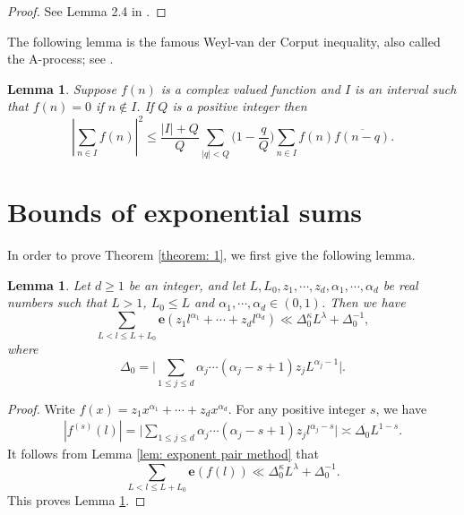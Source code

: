 \documentclass[12pt, reqno, twoside, letterpaper]{amsart}
\numberwithin{equation}{section}
\theoremstyle{customthm}
\newtheorem{lemma}[X]{Lemma}
\theoremstyle{customrem}
\renewcommand{\le}{\ensuremath{\leqslant}}
\begin{document}
\begin{proof}
See Lemma 2.4 in \cite{GrahamK1991}.
\end{proof}

The following lemma is the famous Weyl-van der Corput inequality, also called the A-process; see \cite[Lemma 2.5]{GrahamK1991}.

\begin{lemma}
\label{lem:A}
Suppose $f(n)$ is a complex valued function and $I$ is an interval such that $f(n) = 0$ if $n \notin I$. If $Q$ is a positive integer then
$$
|\sum_{n \in I} f(n)|^2 \le \frac{|I| + Q}{Q} \sum_{|q|< Q} \big(1 - \frac{q}{Q} \big) \sum_{n \in I} f(n) \overline{f(n-q)}.
$$
\end{lemma}

\section{Bounds of exponential sums}\label{section: bounds of es}

In order to prove Theorem \ref{theorem: 1}, we first give the following lemma.

\begin{lemma}\label{lemma: a lemmma to estimate S}
Let $d\geqslant 1$ be an integer, and let $L,L_0,z_1,\cdots,z_d,\alpha_1,\cdots,
\alpha_d$ be real numbers such that $L>1$, $L_0\leqslant L$ and
$\alpha_1,\cdots,\alpha_d\in(0,1)$. Then we have
$$
\sum_{L<l\leqslant L+L_0}\mathbf{e}\left(z_1l^{\alpha_1}+\cdots+z_dl^{\alpha_d}\right)
\ll \Delta_0^{\kappa}L^{\lambda}+\Delta_0^{-1},
$$
where
$$
\Delta_0=\Bigg|\sum_{1\leqslant j\leqslant d}\alpha_j\cdots(\alpha_j-s+1)z_jL^{\alpha_j-1}\Bigg|.
$$
\end{lemma}
\begin{proof}
Write $f(x)=z_1x^{\alpha_1}+\cdots+z_dx^{\alpha_d}$. For any positive integer $s$,
we have
\begin{align*}
|f^{(s)}(l)|=\Bigg|\sum_{1\leqslant j\leqslant d}\alpha_j\cdots(\alpha_j-s+1)
z_jl^{\alpha_j-s}\Bigg|\asymp \Delta_0 L^{1-s}.
\end{align*}
It follows from Lemma \ref{lem: exponent pair method} that
$$
\sum_{L<l\leqslant L+L_0}\mathbf{e}\left(f(l)\right)
\ll \Delta_0^{\kappa}L^{\lambda}+\Delta_0^{-1}.
$$
This proves Lemma \ref{lemma: a lemmma to estimate S}.
\end{proof}
\end{document}
